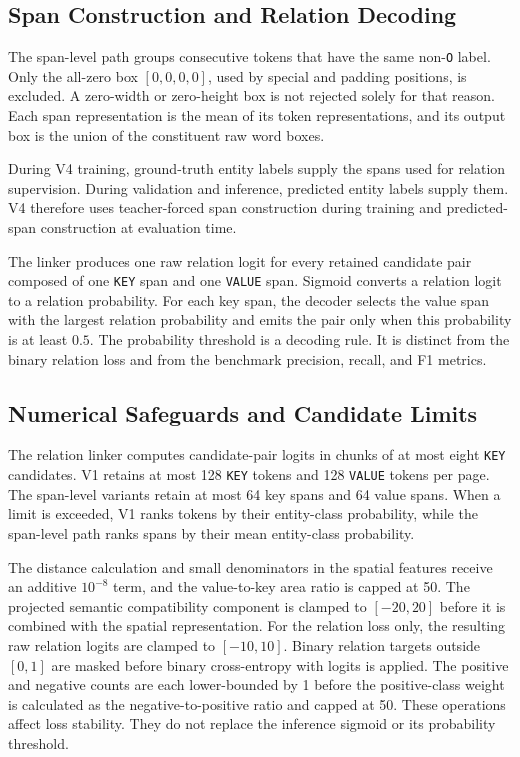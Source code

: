 \subsection{Span Construction and Relation Decoding}
\label{sec:entity-classifier-impl}

The span-level path groups consecutive tokens that have the same non-\texttt{O}
label. Only the all-zero box $[0,0,0,0]$, used by special and padding
positions, is excluded. A zero-width or zero-height box is not rejected solely
for that reason. Each span representation is the mean of its token
representations, and its output box is the union of the constituent raw word
boxes.

During V4 training, ground-truth entity labels supply the spans used for
relation supervision. During validation and inference, predicted entity labels
supply them. V4 therefore uses teacher-forced span construction during training
and predicted-span construction at evaluation time.

The linker produces one raw relation logit for every retained candidate pair
composed of one \texttt{KEY} span and one \texttt{VALUE} span. Sigmoid converts a
relation logit to a relation probability. For each key span, the decoder selects
the value span with the largest relation probability and emits the pair only
when this probability is at least $0.5$. The probability threshold is a
decoding rule. It is distinct from the binary relation loss and from the
benchmark precision, recall, and F1 metrics.

\subsection{Numerical Safeguards and Candidate Limits}
\label{sec:linker-impl}

The relation linker computes candidate-pair logits in chunks of at most eight
\texttt{KEY} candidates. V1 retains at most 128 \texttt{KEY} tokens and 128
\texttt{VALUE} tokens per page. The
span-level variants retain at most 64 key spans and 64 value spans. When a
limit is exceeded, V1 ranks tokens by their entity-class probability, while
the span-level path ranks spans by their mean entity-class probability.

The distance calculation and small denominators in the spatial features receive
an additive $10^{-8}$ term, and the value-to-key area ratio is capped at 50.
The projected semantic compatibility component is clamped to $[-20,20]$ before it is
combined with the spatial representation. For the relation loss only, the
resulting raw relation logits are clamped to $[-10,10]$. Binary relation targets
outside $[0,1]$ are masked before binary cross-entropy with logits is applied.
The positive and negative counts are each lower-bounded by 1 before the
positive-class weight is calculated as the negative-to-positive ratio and
capped at 50. These operations affect loss stability. They do not replace the inference
sigmoid or its probability threshold.

